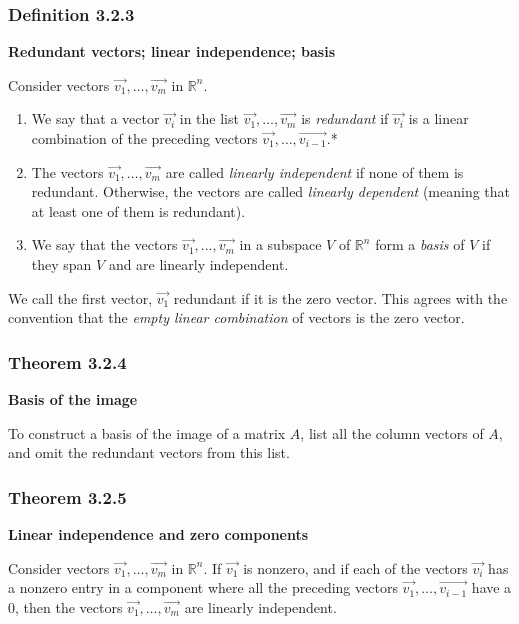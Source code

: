 \documentclass{report}
\begin{document}
\subsubsection*{Definition 3.2.3}
\par\noindent\textbf{Redundant vectors; linear independence; basis}
\par\noindent Consider vectors $\vec{v_{1}},\ldots{},\vec{v_{m}}$ in $\mathbb{R}^{n}$.
\renewcommand{\labelenumi}{\textbf{\alph{enumi}.}}
\begin{enumerate}
\item We say that a vector $\vec{v_{i}}$ in the list $\vec{v_{1}},\ldots{},\vec{v_{m}}$ is \textit{redundant} if $\vec{v_{i}}$ is a linear combination of the preceding vectors $\vec{v_{1}},\ldots{},\vec{v_{i-1}}$.*
\item The vectors $\vec{v_{1}},\ldots{},\vec{v_{m}}$ are called \textit{linearly independent} if none of them is redundant. Otherwise, the vectors are called \textit{linearly dependent} (meaning that at least one of them is redundant).
\item We say that the vectors $\vec{v_{1}},\ldots{},\vec{v_{m}}$ in a subspace $V$ of $\mathbb{R}^{n}$ form a \textit{basis} of $V$ if they span $V$ and are linearly independent.
\end{enumerate}
\par\noindent *We call the first vector, $\vec{v_{1}}$ redundant if it is the zero vector. This agrees with the convention that the \textit{empty linear combination} of vectors is the zero vector.
\subsubsection*{Theorem 3.2.4}
\par\noindent\textbf{Basis of the image}
\par\noindent To construct a basis of the image of a matrix $A$, list all the column vectors of $A$, and omit the redundant vectors from this list.
\subsubsection*{Theorem 3.2.5}
\par\noindent\textbf{Linear independence and zero components}
\par\noindent Consider vectors $\vec{v_{1}},\ldots{},\vec{v_{m}}$ in $\mathbb{R}^{n}$. If $\vec{v_{1}}$ is nonzero, and if each of the vectors $\vec{v_{i}}$ has a nonzero entry in a component where all the preceding vectors $\vec{v_{1}},\ldots{},\vec{v_{i-1}}$ have a $0$, then the vectors $\vec{v_{1}},\ldots{},\vec{v_{m}}$ are linearly independent.
\end{document}
